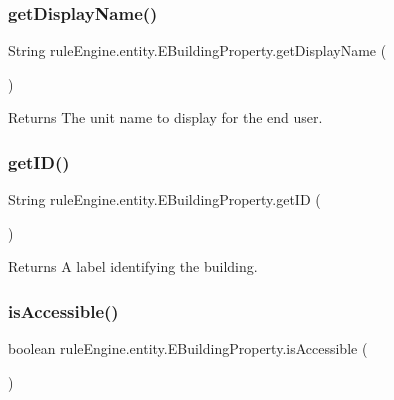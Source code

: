 \subsubsection{\texorpdfstring{get\+Display\+Name()}{getDisplayName()}}
{\footnotesize\ttfamily String rule\+Engine.\+entity.\+E\+Building\+Property.\+get\+Display\+Name (\begin{DoxyParamCaption}{ }\end{DoxyParamCaption})\hspace{0.3cm}{\ttfamily [inline]}}

\begin{DoxyReturn}{Returns}
The unit name to display for the end user. 
\end{DoxyReturn}
\mbox{\label{enumrule_engine_1_1entity_1_1_e_building_property_aea4201c544b7f092b58fa4e53bd095dc}} 
\subsubsection{\texorpdfstring{get\+I\+D()}{getID()}}
{\footnotesize\ttfamily String rule\+Engine.\+entity.\+E\+Building\+Property.\+get\+ID (\begin{DoxyParamCaption}{ }\end{DoxyParamCaption})\hspace{0.3cm}{\ttfamily [inline]}}

\begin{DoxyReturn}{Returns}
A label identifying the building. 
\end{DoxyReturn}
\mbox{\label{enumrule_engine_1_1entity_1_1_e_building_property_a4897fdf509002eb7cd5c1b1b5c8f10fe}} 
\subsubsection{\texorpdfstring{is\+Accessible()}{isAccessible()}}
{\footnotesize\ttfamily boolean rule\+Engine.\+entity.\+E\+Building\+Property.\+is\+Accessible (\begin{DoxyParamCaption}{ }\end{DoxyParamCaption})\hspace{0.3cm}{\ttfamily [inline]}}

